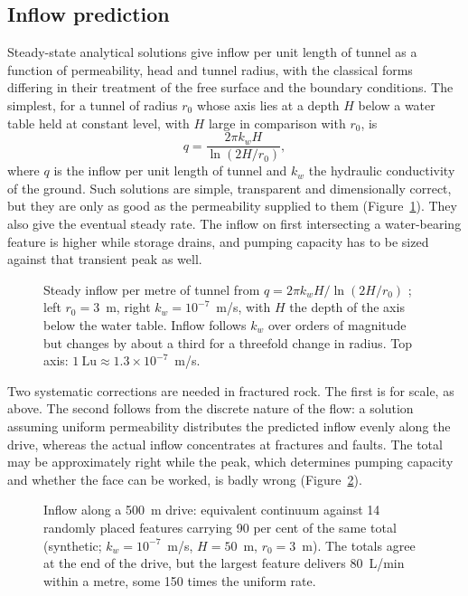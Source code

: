 \subsection{Inflow prediction}
\label{sec:inflow-prediction}

Steady-state analytical solutions give inflow per unit length of tunnel as a
function of permeability, head and tunnel radius, with the classical
forms~\citep{goodman1965inflow,eltani2003circular} differing in their
treatment of the free surface and the boundary conditions. The simplest, for
a tunnel of radius $r_0$ whose axis lies at a depth $H$ below a water table
held at constant level, with $H$ large in comparison with $r_0$, is
\[
q = \frac{2\pi k_w H}{\ln\left(2H/r_0\right)} ,
\]
where $q$ is the inflow per unit length of tunnel and $k_w$ the hydraulic
conductivity of the ground.
Such solutions are simple, transparent and dimensionally correct, but they are only as
good as the permeability supplied to them (Figure~\ref{fig:inflow-goodman}).
They also give the eventual
steady rate. The inflow on first intersecting a water-bearing feature is
higher while storage drains, and pumping capacity has to be sized against
that transient peak as well.

\begin{figure}[htbp]
\centering
{}
\caption{Steady inflow per metre of tunnel from $q = 2\pi k_w H/\ln(2H/r_0)$ \citep{goodman1965inflow}; left $r_0 = 3$~m, right $k_w = 10^{-7}$~m/s, with $H$ the depth of the axis below the water table. Inflow follows $k_w$ over orders of magnitude but changes by about a third for a threefold change in radius. Top axis: $1~\mathrm{Lu} \approx 1.3\times10^{-7}$~m/s.}
\label{fig:inflow-goodman}
\end{figure}

Two systematic corrections are needed in fractured rock. The first is for
scale, as above. The second follows from the discrete nature of the flow: a
solution assuming uniform permeability distributes the predicted inflow evenly
along the drive, whereas the actual inflow concentrates at fractures and faults.
The total may be approximately right while the peak, which determines pumping
capacity and whether the face can be worked, is badly wrong
(Figure~\ref{fig:inflow-discrete}).

\begin{figure}[htbp]
\centering
{}
\caption{Inflow along a 500~m drive: equivalent continuum against 14 randomly placed features carrying 90 per cent of the same total (synthetic; $k_w = 10^{-7}$~m/s, $H = 50$~m, $r_0 = 3$~m). The totals agree at the end of the drive, but the largest feature delivers 80~L/min within a metre, some 150 times the uniform rate.}
\label{fig:inflow-discrete}
\end{figure}

